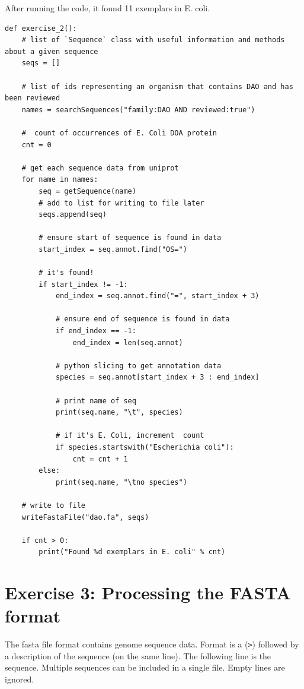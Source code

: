\documentclass{article} %
\begin{document}
After running the code, it found 11 exemplars in E. coli.

\begin{verbatim}
def exercise_2():
    # list of `Sequence` class with useful information and methods about a given sequence
    seqs = []

    # list of ids representing an organism that contains DAO and has been reviewed
    names = searchSequences("family:DAO AND reviewed:true")

    #  count of occurrences of E. Coli DOA protein
    cnt = 0

    # get each sequence data from uniprot
    for name in names:
        seq = getSequence(name)
        # add to list for writing to file later
        seqs.append(seq)

        # ensure start of sequence is found in data
        start_index = seq.annot.find("OS=")

        # it's found!
        if start_index != -1:
            end_index = seq.annot.find("=", start_index + 3)

            # ensure end of sequence is found in data
            if end_index == -1:
                end_index = len(seq.annot)

            # python slicing to get annotation data
            species = seq.annot[start_index + 3 : end_index]

            # print name of seq
            print(seq.name, "\t", species)

            # if it's E. Coli, increment  count
            if species.startswith("Escherichia coli"):
                cnt = cnt + 1
        else:
            print(seq.name, "\tno species")

    # write to file
    writeFastaFile("dao.fa", seqs)

    if cnt > 0:
        print("Found %d exemplars in E. coli" % cnt)
\end{verbatim}

\section{Exercise 3: Processing the FASTA format}

The fasta file format contains genome sequence data. Format is a (\verb+>+) followed by a description of the sequence (on the same line). The following line is the sequence. Multiple sequences can be included in a single file. Empty lines are ignored.
\end{document}
